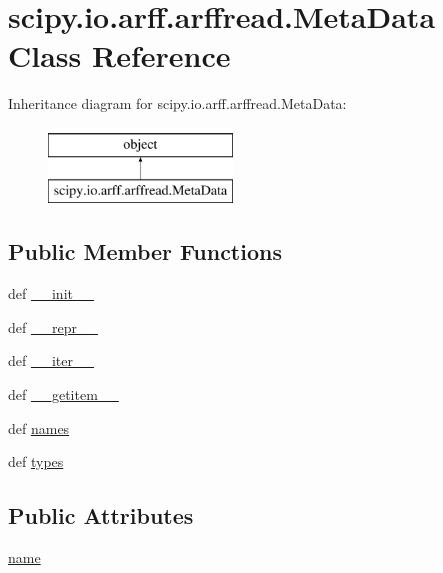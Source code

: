 \hypertarget{classscipy_1_1io_1_1arff_1_1arffread_1_1MetaData}{}\section{scipy.\+io.\+arff.\+arffread.\+Meta\+Data Class Reference}
\label{classscipy_1_1io_1_1arff_1_1arffread_1_1MetaData}
Inheritance diagram for scipy.\+io.\+arff.\+arffread.\+Meta\+Data\+:\begin{figure}[H]
\begin{center}
\leavevmode
\includegraphics[height=2.000000cm]{classscipy_1_1io_1_1arff_1_1arffread_1_1MetaData}
\end{center}
\end{figure}
\subsection*{Public Member Functions}
\begin{DoxyCompactItemize}
\item 
def \hyperlink{classscipy_1_1io_1_1arff_1_1arffread_1_1MetaData_a79b3bd570e69afbdd4327b4b2b084e21}{\+\_\+\+\_\+init\+\_\+\+\_\+}
\item 
def \hyperlink{classscipy_1_1io_1_1arff_1_1arffread_1_1MetaData_a1747c365833b1c4b6efae7d41f68aa36}{\+\_\+\+\_\+repr\+\_\+\+\_\+}
\item 
def \hyperlink{classscipy_1_1io_1_1arff_1_1arffread_1_1MetaData_aa6f4a1223a7a523186fc05ddc8efd489}{\+\_\+\+\_\+iter\+\_\+\+\_\+}
\item 
def \hyperlink{classscipy_1_1io_1_1arff_1_1arffread_1_1MetaData_a08fd0ca9f97b35ef3e056eaf5d46bf5a}{\+\_\+\+\_\+getitem\+\_\+\+\_\+}
\item 
def \hyperlink{classscipy_1_1io_1_1arff_1_1arffread_1_1MetaData_aaa196e9f8bf9b268ff4123a2342ed68c}{names}
\item 
def \hyperlink{classscipy_1_1io_1_1arff_1_1arffread_1_1MetaData_a5000cd9a3ace145fb824699d73ac6337}{types}
\end{DoxyCompactItemize}
\subsection*{Public Attributes}
\begin{DoxyCompactItemize}
\item 
\hyperlink{classscipy_1_1io_1_1arff_1_1arffread_1_1MetaData_a8d519313d0a8931480620a93b9e93b32}{name}
\end{DoxyCompactItemize}


